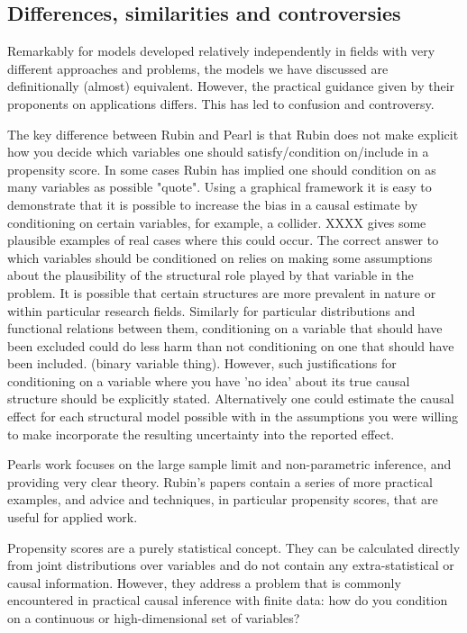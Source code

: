 \documentclass[11pt,a4paper]{article}
\begin{document}
\subsection*{Differences, similarities and controversies}



Remarkably for models developed relatively independently in fields with very different approaches and problems, the models we have discussed are definitionally (almost) equivalent. However, the practical guidance given by their proponents on applications differs. This has led to confusion and controversy.  

The key difference between Rubin and Pearl is that Rubin does not make explicit how you decide which variables one should satisfy/condition on/include in a propensity score. In some cases Rubin has implied one should condition on as many variables as possible "quote". Using a graphical framework it is easy to demonstrate that it is possible to increase the bias in a causal estimate by conditioning on certain variables, for example, a collider.  XXXX gives some plausible examples of real cases where this could occur. The correct answer to which variables should be conditioned on relies on making some assumptions about the plausibility of the structural role played by that variable in the problem. It is possible that certain structures are more prevalent in nature or within particular research fields. Similarly for particular distributions and functional relations between them, conditioning on a variable that should have been excluded could do less harm than not conditioning on one that should have been included. (binary variable thing). However, such justifications for conditioning on a variable where you have 'no idea' about its true causal structure should be explicitly stated. Alternatively one could estimate the causal effect for each structural model possible with in the assumptions you were willing to make incorporate the resulting uncertainty into the reported effect.   

Pearls work focuses on the large sample limit and non-parametric inference, and providing very clear theory. Rubin's papers contain a series of more practical examples, and advice and techniques, in particular propensity scores, that are useful for applied work.

Propensity scores are a purely statistical concept. They can be calculated directly from joint distributions over variables and do not contain any extra-statistical or causal information. However, they address a problem that is commonly encountered in practical causal inference with finite data: how do you condition on a continuous or high-dimensional set of variables? 
\end{document}
